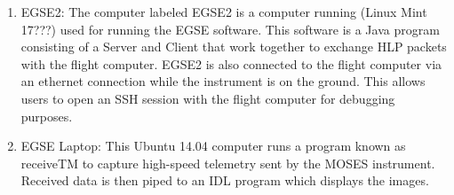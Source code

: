 \begin{enumerate}
\begin{enumerate}
			\item EGSE2: The computer labeled EGSE2 is a computer running (Linux Mint 17???) used for running the EGSE software. This software is a Java program consisting of a Server and Client that work together to exchange HLP packets with the flight computer. EGSE2 is also connected to the flight computer via an ethernet connection while the instrument is on the ground. This allows users to open an SSH session with the flight computer for debugging purposes.
			\item EGSE Laptop: This Ubuntu 14.04 computer runs a program known as receiveTM to capture high-speed telemetry sent by the MOSES instrument. Received data is then piped to an IDL program which displays the images.
		\end{enumerate}
	\end{enumerate}
